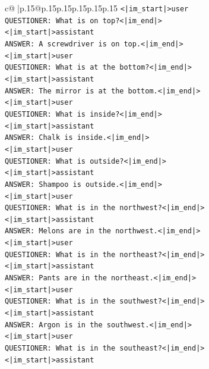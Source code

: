 \documentclass{article}
\begin{document}
{\begin{supertabular}{c@{$\;$}|p{.15\linewidth}@{}p{.15\linewidth}p{.15\linewidth}p{.15\linewidth}p{.15\linewidth}p{.15\linewidth}}
{{{\texttt{<|im\_start|>user} \\
\texttt{QUESTIONER: What is on top?<|im\_end|>} \\
\texttt{<|im\_start|>assistant} \\
\texttt{ANSWER: A screwdriver is on top.<|im\_end|>} \\
\texttt{<|im\_start|>user} \\
\texttt{QUESTIONER: What is at the bottom?<|im\_end|>} \\
\texttt{<|im\_start|>assistant} \\
\texttt{ANSWER: The mirror is at the bottom.<|im\_end|>} \\
\texttt{<|im\_start|>user} \\
\texttt{QUESTIONER: What is inside?<|im\_end|>} \\
\texttt{<|im\_start|>assistant} \\
\texttt{ANSWER: Chalk is inside.<|im\_end|>} \\
\texttt{<|im\_start|>user} \\
\texttt{QUESTIONER: What is outside?<|im\_end|>} \\
\texttt{<|im\_start|>assistant} \\
\texttt{ANSWER: Shampoo is outside.<|im\_end|>} \\
\texttt{<|im\_start|>user} \\
\texttt{QUESTIONER: What is in the northwest?<|im\_end|>} \\
\texttt{<|im\_start|>assistant} \\
\texttt{ANSWER: Melons are in the northwest.<|im\_end|>} \\
\texttt{<|im\_start|>user} \\
\texttt{QUESTIONER: What is in the northeast?<|im\_end|>} \\
\texttt{<|im\_start|>assistant} \\
\texttt{ANSWER: Pants are in the northeast.<|im\_end|>} \\
\texttt{<|im\_start|>user} \\
\texttt{QUESTIONER: What is in the southwest?<|im\_end|>} \\
\texttt{<|im\_start|>assistant} \\
\texttt{ANSWER: Argon is in the southwest.<|im\_end|>} \\
\texttt{<|im\_start|>user} \\
\texttt{QUESTIONER: What is in the southeast?<|im\_end|>} \\
\texttt{<|im\_start|>assistant} \\
}}}
\end{supertabular}}
\end{document}
